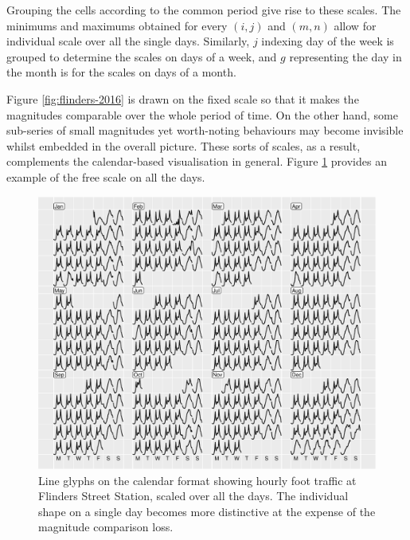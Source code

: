 \documentclass[article]{jss}
\begin{document}
Grouping the cells according to the common period give rise to these
scales. The minimums and maximums obtained for every \((i, j)\) and
\((m, n)\) allow for individual scale over all the single days.
Similarly, \(j\) indexing day of the week is grouped to determine the
scales on days of a week, and \(g\) representing the day in the month is
for the scales on days of a month.

Figure \ref{fig:flinders-2016} is drawn on the fixed scale so that it
makes the magnitudes comparable over the whole period of time. On the
other hand, some sub-series of small magnitudes yet worth-noting
behaviours may become invisible whilst embedded in the overall picture.
These sorts of scales, as a result, complements the calendar-based
visualisation in general. Figure \ref{fig:flinders-free} provides an
example of the free scale on all the days.

\begin{CodeChunk}
\begin{figure}

{\centering \includegraphics[width=\textwidth]{figure/flinders-free-1} 

}

\caption[Line glyphs on the calendar format showing hourly foot traffic at Flinders Street Station, scaled over all the days]{Line glyphs on the calendar format showing hourly foot traffic at Flinders Street Station, scaled over all the days. The individual shape on a single day becomes more distinctive at the expense of the magnitude comparison loss.}\label{fig:flinders-free}
\end{figure}
\end{CodeChunk}
\end{document}
